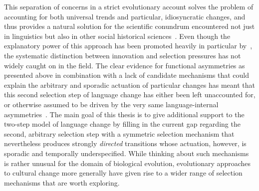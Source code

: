 This separation of concerns in a strict evolutionary account solves the problem of accounting for both universal trends and particular, idiosyncratic changes, and thus provides a natural solution for the scientific conundrum encountered not just in linguistics but also in other social historical sciences~\citep{Blute1997}. Even though the explanatory power of this approach has been promoted heavily in particular by~\citet{Croft2000,Croft2006,Croft2008}, the systematic distinction between innovation and selection pressures has not widely caught on in the field. The clear evidence for functional asymmetries as presented above in combination with a lack of candidate mechanisms that could explain the arbitrary and sporadic actuation of particular changes has meant that this second selection step of language change has either been left unaccounted for, or otherwise assumed to be driven by the very same language-internal asymmetries~\citep[p.111]{Croft2006}.
The main goal of this thesis is to give additional support to the two-step model of language change by filling in the current gap regarding the second, arbitrary selection step with a symmetric selection mechanism that nevertheless produces strongly \emph{directed} transitions whose actuation, however, is sporadic and temporally underspecified.
While thinking about such mechanisms is rather unusual for the domain of biological evolution, evolutionary approaches to cultural change more generally have given rise to a wider range of selection mechanisms that are worth exploring.




